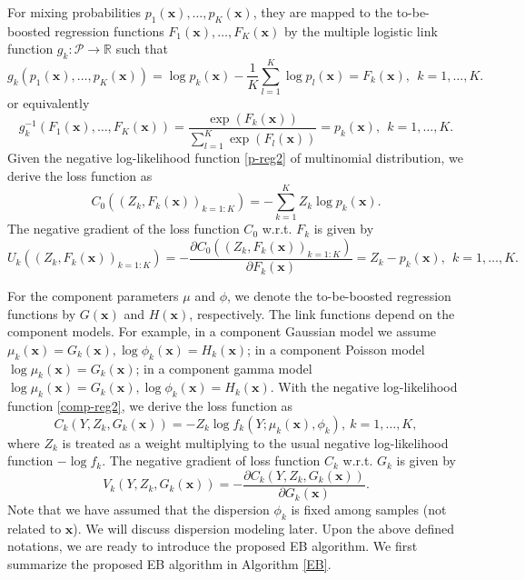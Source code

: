 \documentclass[11pt]{article}
\numberwithin{equation}{section}
\def\R{{\mathbb R}}  %
\def\bx{\boldsymbol{x}}
\newcommand{\blue}[1]{\textcolor{blue}{#1}}
\begin{document}
For mixing probabilities $p_1(\bx),\ldots,p_K(\bx)$, they are mapped to the to-be-boosted regression functions $F_1(\bx),\ldots,F_K(\bx)$ by the multiple logistic link function $g_k:\mathcal{P}\rightarrow \R$ such that 
\begin{equation}\label{inv-logistic}
		g_k(p_1(\bx),\ldots,p_K(\bx))=\log p_k(\bx)-\frac{1}{K}\sum_{l=1}^K\log p_l(\bx)=F_k(\bx),~~k=1,\ldots,K.
\end{equation}
or equivalently
	\begin{equation}\label{logistic}
	g_k^{-1}(F_1(\bx),\ldots,F_K(\bx))=\frac{\exp\left(F_k(\bx)\right)}{\sum_{l=1}^{K}\exp\left(F_l(\bx)\right)}=	p_k(\bx),~~k=1,\ldots,K.
	\end{equation}
Given the negative log-likelihood function \eqref{p-reg2} of multinomial distribution, we derive the loss function as
\begin{equation}\label{p-loss}
		{C_{0}\left((Z_k, F_k(\bx))_{k=1:K}\right)}= - \sum_{k=1}^K Z_k \log p_k(\bx).
\end{equation}
The negative gradient of the loss function $C_0$ w.r.t. $F_k$ is given by
\begin{equation}\label{p-gradient}
	{U_k\left((Z_k, F_k(\bx))_{k=1:K}\right)}=-\frac{\partial C_0\left((Z_k, F_k(\bx))_{k=1:K}\right)}{\partial F_k(\bx)}=
	Z_k-p_k(\bx), ~~k=1,\ldots,K.
\end{equation}

For the component parameters $\mu$ and $\phi$,  we denote the to-be-boosted regression functions by $G(\bx)$ and $H(\bx)$, respectively. 
The link functions depend on the component models.  For example, in a component Gaussian model we assume $\mu_k(\bx)=G_k(\bx), \log \phi_k(\bx)=H_k(\bx)$; 
in a component Poisson model $\log\mu_k(\bx)=G_k(\bx)$; 
in a component gamma model $\log \mu_k(\bx)=G_k(\bx), \log \phi_k(\bx)=H_k(\bx).$
With the negative log-likelihood function \eqref{comp-reg2}, we derive the loss function as
	\begin{equation}\label{comp-loss}
		{C_k(Y,Z_k,G_k(\bx))}= -Z_k\log f_k(Y;\mu_k(\bx),\phi_k), ~ k=1,\ldots,K,
	\end{equation}
where $Z_k$ is treated as a weight multiplying to the usual negative log-likelihood function $-\log f_k$.
	The negative gradient of loss function $C_k$ w.r.t. $G_k$ is given by 
\begin{equation}\label{comp-gradient}
{V_k(Y,Z_k,G_k(\bx))}=-\frac{\partial C_k(Y,Z_k,G_k(\bx))}{\partial G_k(\bx)}.
\end{equation}
Note that we have assumed that the dispersion $\phi_k$ is fixed among samples (not related to $\bx$). 
We will discuss dispersion modeling later.
Upon the above defined notations, we are ready to introduce the proposed EB algorithm.
We first summarize the proposed EB algorithm in Algorithm \ref{EB}.
\end{document}
